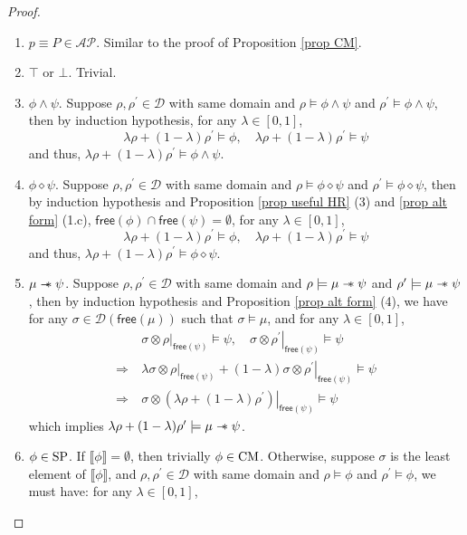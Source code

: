 \documentclass[conference,compsoc, 10pt]{IEEEtran}
\newcommand {\cD } {{\mathcal{D}}}
\newcommand {\free }[1] {{\mathsf{free}\left(#1\right)}}
\newcommand {\rt }[2] {{\left.{#1}\right|_{#2}}}
\newcommand {\sepimp} {\mathrel{-\mkern-6mu*}}
\newcommand {\sem}[1] {\llbracket#1\rrbracket}
\newcommand {\AP} {{\mathcal{AP}}}
\newcommand{\sd}{\diamond}%
\begin{document}
\begin{appendices}
		\begin{proof}
			\begin{enumerate}
				\item $p\equiv P\in\AP$. Similar to the proof of Proposition \ref{prop CM}.
				\item $\top$ or $\bot$. Trivial.
				\item $\phi\wedge\psi$. Suppose $\rho,\rho^\prime\in\cD$ with same domain and $\rho\models \phi\wedge\psi$ and $\rho^\prime\models \phi\wedge\psi$, then by induction hypothesis, for any $\lambda\in[0,1]$, 
				$$\lambda\rho + (1-\lambda)\rho^\prime \models\phi,\quad \lambda\rho + (1-\lambda)\rho^\prime \models\psi$$
				and thus, $\lambda\rho + (1-\lambda)\rho^\prime \models\phi\wedge\psi$.
				\item $\phi\sd\psi$. Suppose $\rho,\rho^\prime\in\cD$ with same domain and $\rho\models \phi\sd\psi$ and $\rho^\prime\models \phi\sd\psi$, then by induction hypothesis and Proposition \ref{prop useful HR} (3) and \ref{prop alt form} (1.c), $\free{\phi}\cap\free{\psi} = \emptyset$, for any $\lambda\in[0,1]$, 
				$$\lambda\rho + (1-\lambda)\rho^\prime \models\phi,\quad \lambda\rho + (1-\lambda)\rho^\prime \models\psi$$
				and thus, $\lambda\rho + (1-\lambda)\rho^\prime \models\phi\sd\psi$.
				\item $\mu\sepimp\psi$. Suppose $\rho,\rho^\prime\in\cD$ with same domain and $\rho\models \mu\sepimp\psi$ and $\rho^\prime\models \mu\sepimp\psi$, then by induction hypothesis and Proposition \ref{prop alt form} (4), we have for any $\sigma\in\cD(\free{\mu})$ such that $\sigma\models\mu$, and for any $\lambda\in[0,1]$,
				\begin{align*}
				&\sigma\otimes\rt{\rho}{\free{\psi}}\models\psi,\quad \sigma\otimes\rt{\rho^\prime}{\free{\psi}}\models\psi \\
				\Rightarrow\ & \lambda\sigma\otimes\rt{\rho}{\free{\psi}} + (1-\lambda)\sigma\otimes\rt{\rho^\prime}{\free{\psi}} \models\psi \\
				\Rightarrow\ & \sigma\otimes\rt{\left(\lambda\rho + (1-\lambda)\rho^\prime\right)}{\free{\psi}} \models\psi
				\end{align*}
				which implies $\lambda\rho + (1-\lambda)\rho^\prime \models\mu\sepimp\psi$.
				\item $\phi\in{\rm SP}$. If $\sem{\phi} = \emptyset$, then trivially $\phi\in{\rm CM}$. Otherwise, suppose $\sigma$ is the least element of $\sem{\phi}$, and $\rho,\rho^\prime\in\cD$ with same domain and $\rho\models \phi$ and $\rho^\prime\models \phi$, we must have: for any $\lambda\in[0,1]$,

\end{enumerate}
\end{proof}
\end{appendices}
\end{document}
